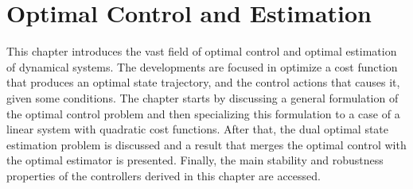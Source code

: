 \documentclass[a4paper,11pt]{book}
\numberwithin{figure}{chapter}
\numberwithin{equation}{chapter}
\numberwithin{table}{chapter}
\theoremstyle{definition}
\newcounter{boxed-theorem}
\newcounter{boxed-definition}
\begin{document}




\clearpage
\chapter{Optimal Control and Estimation}

This chapter introduces the vast field of optimal control and optimal estimation of dynamical systems. The developments are focused in optimize a cost function that produces an optimal state trajectory, and the control actions that causes it, given some conditions. The chapter starts by discussing a general formulation of the optimal control problem and then specializing this formulation to a case of a linear system with quadratic cost functions. After that, the dual optimal state estimation problem is discussed and a result that merges the optimal control with the optimal estimator is presented. Finally, the main stability and robustness properties of the controllers derived in this chapter are accessed.
\end{document}
